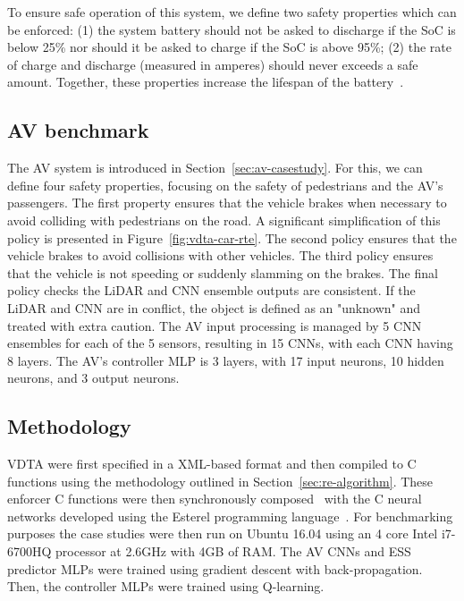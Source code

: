To ensure safe operation of this system, we define two safety properties which can be enforced:
(1) the system battery should not be asked to discharge if the \ac{SoC} is below 25\% nor should it be asked to charge if the \ac{SoC} is above 95\%;
(2) the rate of charge and discharge (measured in amperes) should never exceeds a safe amount.
Together, these properties increase the lifespan of the battery~\cite{guo2016mechanism}. 

\subsection{\acf{AV} benchmark}

The \ac{AV} system is introduced in Section~\ref{sec:av-casestudy}.
For this, we can define four safety properties, focusing on the safety of pedestrians and the \ac{AV}'s passengers.
The first property ensures that the vehicle brakes when necessary to avoid colliding with pedestrians on the road.
A significant simplification of this policy is presented in Figure~\ref{fig:vdta-car-rte}.
The second policy ensures that the vehicle brakes to avoid collisions with other vehicles.
The third policy ensures that the vehicle is not speeding or suddenly slamming on the brakes.
The final policy checks the LiDAR and \ac{CNN} ensemble outputs are
consistent. If the LiDAR and \ac{CNN} are in conflict, 
the object is defined as an "unknown" and treated with extra caution.
The \ac{AV} input processing is managed by 5 \ac{CNN} ensembles for each of the 5 sensors, resulting in 15 \acp{CNN}, with each \ac{CNN} having 8 layers. 
The \ac{AV}'s controller  MLP is 3 layers, with 17 input neurons, 10 hidden neurons, and 3 output neurons.

\subsection{Methodology}
\ac{VDTA} were first specified in a XML-based format and then compiled to C functions using the methodology outlined in Section~\ref{sec:re-algorithm}.
These enforcer C functions were then synchronously composed~\cite{SynchronousLanguages12YearsLater} with the C neural networks developed using the Esterel programming language~\cite{Berry00}.
For benchmarking purposes the case studies were then run on Ubuntu 16.04 using an 4 core Intel i7-6700HQ processor at 2.6GHz with 4GB of RAM.
The \ac{AV} \acp{CNN} and \ac{ESS} predictor \acp{MLP} were trained using gradient descent with back-propagation.
Then, the controller \acp{MLP} were trained using Q-learning.

